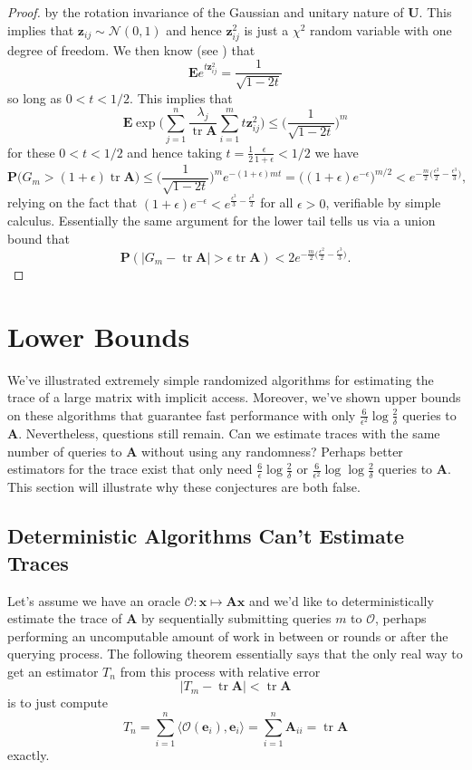 \documentclass[10pt,letterpaper]{siamart171218}
\theoremstyle{definition}
\theoremstyle{remark}
\newcommand\inner[1]{\langle #1 \rangle}
\renewcommand\P{\mathbf{P}}
\newcommand\E{\mathbf{E}}
\renewcommand\O{\mathcal{O}}
\newcommand\tr{\operatorname{tr}}
\newcommand\A{\boldsymbol{A}}
\newcommand\U{\boldsymbol{U}}
\newcommand\x{\boldsymbol{x}}
\newcommand\z{\boldsymbol{z}}
\newcommand\e{\boldsymbol{e}}
\begin{document}
\begin{proof}
    by the rotation invariance of the Gaussian and unitary nature of $\U$. This implies
    that $\z_{ij} \sim \mathcal{N}(0,1)$ and hence $\z_{ij}^2$ is just a $\chi^2$ random
    variable with one degree of freedom. We then know (see \cite{wasserman2013all}) that
    \[
        \E e^{t\z_{ij}^2} = \frac{1}{\sqrt{1-2t}}
    \]
    so long as $0 < t < 1/2$. This implies that
    \[
        \E\exp\biggl(\sum_{j=1}^n\frac{\lambda_j}{\tr\A}\sum_{i=1}^m t\z_{ij}^2\biggr) \leq \biggl(\frac{1}{\sqrt{1 - 2t}}\biggr)^m
    \]
    for these $0 < t < 1/2$ and hence taking $t = \tfrac{1}{2}\tfrac{\epsilon}{1+\epsilon} < 1/2$ we have
    \[
        \P\bigl(G_m > (1+\epsilon) \tr\A\bigr) \leq \biggl(\frac{1}{\sqrt{1 - 2t}}\biggr)^m e^{-(1+\epsilon)mt} = \biggl((1+\epsilon) e^{-\epsilon}\biggr)^{m/2} < e^{-\tfrac{m}{2}\bigl(\tfrac{\epsilon^2}{2} - \tfrac{\epsilon^3}{3}\bigr)},
    \]
    relying on the fact that $(1 + \epsilon)e^{-\epsilon} < e^{\tfrac{\epsilon^3}{3}-\tfrac{\epsilon^2}{2}}$
    for all $\epsilon > 0$, verifiable by simple calculus. Essentially the same argument for
    the lower tail tells us via a union bound that
    \[
        \P(|G_m - \tr\A| > \epsilon\tr\A) < 2 e^{-\tfrac{m}{2}\bigl(\tfrac{\epsilon^2}{2}-\tfrac{\epsilon^3}{3}\bigr)}.
    \]
    
\end{proof}

\section{Lower Bounds}

We've illustrated extremely simple randomized algorithms for estimating
the trace of a large matrix with implicit access. Moreover, we've shown
upper bounds on these algorithms that guarantee fast performance with
only $\tfrac{6}{\epsilon^2}\log\tfrac{2}{\delta}$ queries to $\A$.
Nevertheless, questions still remain. Can we estimate traces with the same
number of queries to $\A$ without using any randomness? Perhaps better
estimators for the trace exist that only need $\tfrac{6}{\epsilon}\log\tfrac{2}{\delta}$
or $\tfrac{6}{\epsilon^2}\log\log\tfrac{2}{\delta}$ queries to $\A$.
This section will illustrate why these conjectures are both false.

\subsection{Deterministic Algorithms Can't Estimate Traces}

Let's assume we have an oracle $\O : \x\mapsto \A\x$ and we'd like to deterministically
estimate the trace of $\A$ by sequentially submitting queries $m$ to $\O$, perhaps performing
an uncomputable amount of work in between or rounds or after the querying process.
The following theorem essentially says that the only real way to get an estimator $T_n$ from this process with
relative error
\[
    |T_m - \tr\A| < \tr\A
\]
is to just compute
\[
    T_n = \sum_{i=1}^n \inner{\O(\e_i),\e_i} = \sum_{i=1}^n \A_{ii} = \tr\A
\]
exactly.
\end{document}
